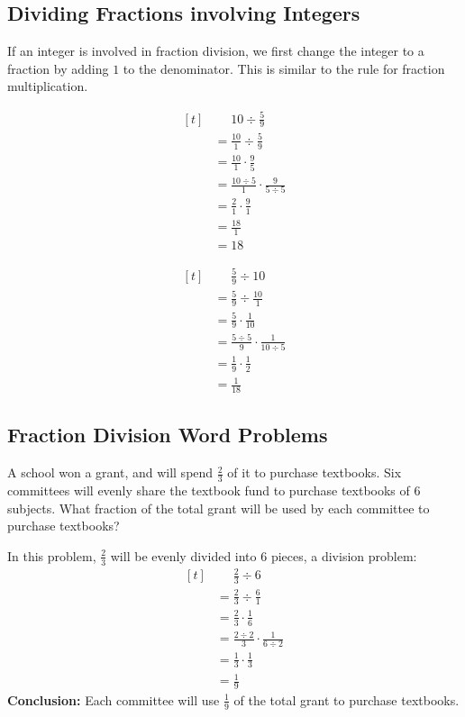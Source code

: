 \subsection{Dividing Fractions involving Integers}
If an integer is involved in fraction division, we first change the integer to a fraction by adding $1$ to the denominator. This is similar to the rule for fraction multiplication.

\begin{myexample}
\[ 
\begin{aligned}[t]
	&\phantom{{}=} 10 \div \frac{5}{9} \\
	&= \frac{10}{1} \div \frac{5}{9} \\
	&= \frac{10}{1} \cdot \frac{9}{5} \\
	&= \frac{10\div5}{1} \cdot \frac{9}{5\div5} \\
	&= \frac{2}{1} \cdot \frac{9}{1} \\
	&= \frac{18}{1} \\
	&= 18
\end{aligned}
\]
\end{myexample}

\begin{myexample}
\[ 
\begin{aligned}[t]
	&\phantom{{}=} \frac{5}{9} \div 10 \\
	&= \frac{5}{9} \div \frac{10}{1} \\
	&= \frac{5}{9} \cdot \frac{1}{10} \\
	&= \frac{5\div5}{9} \cdot \frac{1}{10\div5} \\
	&= \frac{1}{9} \cdot \frac{1}{2} \\
	&= \frac{1}{18}
\end{aligned}
\]
\end{myexample}

\subsection{Fraction Division Word Problems}
\begin{myexample}
A school won a grant, and will spend $\frac{2}{3}$ of it to purchase textbooks. Six committees will evenly share the textbook fund to purchase textbooks of $6$ subjects. What fraction of the total grant will be used by each committee to purchase textbooks?
\end{myexample}
\begin{solution}
In this problem, $\frac{2}{3}$ will be evenly divided into $6$ pieces, a division problem:
\[ 
\begin{aligned}[t]
	&\phantom{{}=} \frac{2}{3} \div 6 \\
	&= \frac{2}{3} \div \frac{6}{1} \\
	&= \frac{2}{3} \cdot \frac{1}{6} \\
	&= \frac{2\div2}{3} \cdot \frac{1}{6\div2} \\
	&= \frac{1}{3} \cdot \frac{1}{3} \\
	&= \frac{1}{9}
\end{aligned}
\]
\textbf{Conclusion:} Each committee will use $\frac{1}{9}$ of the total grant to purchase textbooks.
\end{solution}

